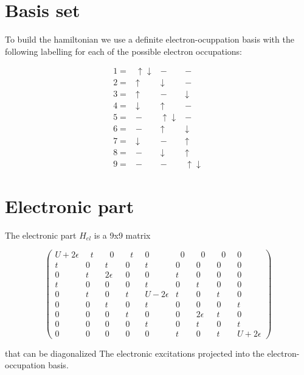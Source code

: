 \section{Basis set}

To build the hamiltonian we use a definite electron-ocuppation basis with the following labelling for each of the possible electron occupations:

\begin{equation}\label{eq:basis-set}\begin{array}{cccc}
1= & \uparrow \downarrow & - & - \\
2= & \uparrow & \downarrow & - \\
3= & \uparrow & - & \downarrow \\
4= & \downarrow & \uparrow & - \\
5= & - & \uparrow \downarrow & - \\
6= & - & \uparrow & \downarrow \\
7= & \downarrow & - & \uparrow \\
8= & - & \downarrow & \uparrow \\
9= & - & - & \uparrow \downarrow \end{array}\end{equation}


\section{Electronic part}

The electronic part $H_{el}$ is a 9x9 matrix

\begin{equation}\label{eq:electronic-matrix}
\left( \begin{array}{ccccccccc} 
U+2\epsilon &\;\;t\;\;&\;\;0\;\;&\;\;t\;\;&0&\;\;0\;\;&\;\;0\;\;&\;\;0\;\;&0 \\
t&0&t&0&t&0&0&0&0 \\
0&t&2\epsilon &0&0&t&0&0&0 \\
t&0&0&0&t&0&t&0&0 \\
0&t&0&t&U-2\epsilon &t&0&t&0 \\
0&0&t&0&t&0&0&0&t \\
0&0&0&t&0&0&2\epsilon &t&0 \\
0&0&0&0&t&0&t&0&t \\
0&0&0&0&0&t&0&t&U+2\epsilon  \end{array} \right)\end{equation}

that can be diagonalized The electronic excitations projected into the electron-occupation basis.


